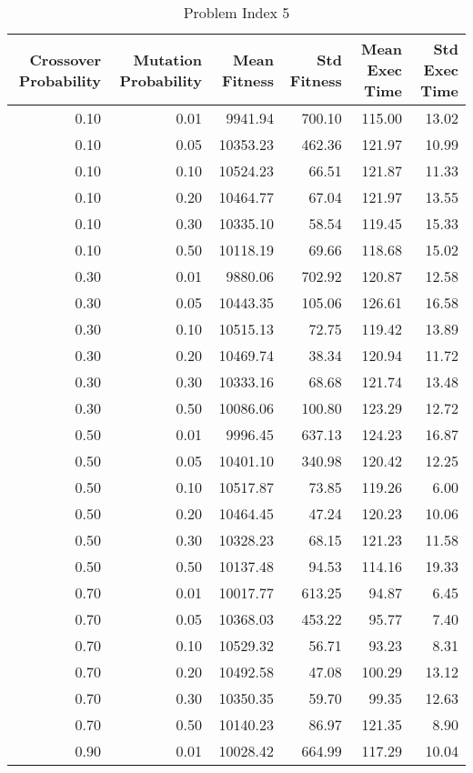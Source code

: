 \begin{table}
\caption{Problem Index 5}
\label{tab:problem_5}
\begin{tabular}{rrrrrr}
\toprule
Crossover Probability & Mutation Probability & Mean Fitness & Std Fitness & Mean Exec Time & Std Exec Time \\
\midrule
0.10 & 0.01 & 9941.94 & 700.10 & 115.00 & 13.02 \\
0.10 & 0.05 & 10353.23 & 462.36 & 121.97 & 10.99 \\
0.10 & 0.10 & 10524.23 & 66.51 & 121.87 & 11.33 \\
0.10 & 0.20 & 10464.77 & 67.04 & 121.97 & 13.55 \\
0.10 & 0.30 & 10335.10 & 58.54 & 119.45 & 15.33 \\
0.10 & 0.50 & 10118.19 & 69.66 & 118.68 & 15.02 \\
0.30 & 0.01 & 9880.06 & 702.92 & 120.87 & 12.58 \\
0.30 & 0.05 & 10443.35 & 105.06 & 126.61 & 16.58 \\
0.30 & 0.10 & 10515.13 & 72.75 & 119.42 & 13.89 \\
0.30 & 0.20 & 10469.74 & 38.34 & 120.94 & 11.72 \\
0.30 & 0.30 & 10333.16 & 68.68 & 121.74 & 13.48 \\
0.30 & 0.50 & 10086.06 & 100.80 & 123.29 & 12.72 \\
0.50 & 0.01 & 9996.45 & 637.13 & 124.23 & 16.87 \\
0.50 & 0.05 & 10401.10 & 340.98 & 120.42 & 12.25 \\
0.50 & 0.10 & 10517.87 & 73.85 & 119.26 & 6.00 \\
0.50 & 0.20 & 10464.45 & 47.24 & 120.23 & 10.06 \\
0.50 & 0.30 & 10328.23 & 68.15 & 121.23 & 11.58 \\
0.50 & 0.50 & 10137.48 & 94.53 & 114.16 & 19.33 \\
0.70 & 0.01 & 10017.77 & 613.25 & 94.87 & 6.45 \\
0.70 & 0.05 & 10368.03 & 453.22 & 95.77 & 7.40 \\
0.70 & 0.10 & 10529.32 & 56.71 & 93.23 & 8.31 \\
0.70 & 0.20 & 10492.58 & 47.08 & 100.29 & 13.12 \\
0.70 & 0.30 & 10350.35 & 59.70 & 99.35 & 12.63 \\
0.70 & 0.50 & 10140.23 & 86.97 & 121.35 & 8.90 \\
0.90 & 0.01 & 10028.42 & 664.99 & 117.29 & 10.04 \\

\end{tabular}
\end{table}

